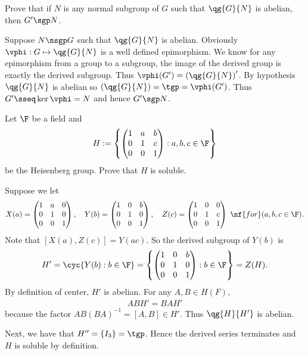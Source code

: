 \documentclass{article}
\begin{document}
\begin{subexercise}
  Prove that if \( N \) is any normal subgroup of \( G \) such that \( \qg{G}{N} \) is abelian, then \( G'\sgp N \).
\end{subexercise}
\begin{solution}
  Suppose \( N \nsgp G \) such that \( \qg{G}{N} \) is abelian.
  Obviously \( \vphi:G\mapsto \qg{G}{N} \) is a well defined epimorphism.
  We know for any epimorphism from a group to a subgroup, the image of the derived group is exactly the derived subgroup.
  Thus \( \vphi(G') = \left( \qg{G}{N} \right)' \).
  By hypothesis \( \qg{G}{N} \) is abelian so \( \left( \qg{G}{N} \right) = \tgp = \vphi(G') \).
  Thus \( G' \sseq \ker\vphi = N \) and hence \( G'\sgp N \).
\end{solution}

\begin{exercise}
  Let \( \F \) be a field and \begin{align*}
    H := \left\{ \begin{pmatrix}
      1 & a & b \\
      0 & 1 & c \\
      0 & 0 & 1
    \end{pmatrix} : a,b,c\in \F \right\}
  \end{align*}
  be the Heisenberg group.
  Prove that \( H \) is soluble.
\end{exercise}
\begin{solution}
Suppose we let \begin{align*}
X(a)=\begin{pmatrix}1&a&0\\0&1&0\\0&0&1\end{pmatrix},\quad
Y(b)=\begin{pmatrix}1&0&b\\0&1&0\\0&0&1\end{pmatrix},\quad
Z(c)=\begin{pmatrix}1&0&0\\0&1&c\\0&0&1\end{pmatrix}
\;\nf{ for }(a,b,c\in \F).
\end{align*}
Note that \( [X(a),Z(c)] = Y(ac) \).
So the derived subgroup of \( Y(b) \) is
\begin{align*}
  H' = \cyc{Y(b):b\in \F} = \left\{ \begin{pmatrix}1&0&b\\0&1&0\\0&0&1\end{pmatrix}: b\in \F
\right\} = Z(H).
\end{align*}
By definition of center, \( H' \) is abelian.
For any \( A,B\in H(F) \),
\begin{align*}
  ABH' = BAH'
\end{align*}
because the factor \( AB(BA)^{-1}=[A,B] \in H' \).
Thus \( \qg{H}{H'} \) is abelian.

Next, we have that \( H'' = \left\{ I_3 \right\} = \tgp \).
Hence the derived series terminates and \( H \) is soluble by definition.
\end{solution}
\end{document}
